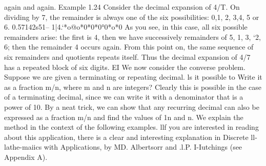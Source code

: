 again and again.
Example 1.24 Consider the decimal expansion of 4/T. On dividing by 7, the remainder is always
one of the six possibilities: 0,1, 2, 3,4, 5 or 6.
0.57142s51--
1|4.‘*o@o*0*0*0°0*o*0
As you see, in this case, all six possible remainders arise: the ﬁrst is 4, then we have successively
remainders of 5, 1, 3, ‘2, 6; then the remainder 4 occurs again. From this point on, the same sequence
of six remainders and quotients repeats itself. Thus the decimal expansion of 4/7 has a repeated
block of six digits. EI
We now consider the converse problem. Suppose we are given a terminating or repeating decimal.
ls it possible to Write it as a fraction m/n, where m and n are integers? Clearly this is possible in
the case of a terminating decimal, since we can write it with a denominator that is a power of 10.
By a neat trick, we can show that any recurring decimal can also be expressed as a fraction m/n
and ﬁnd the values of 1n and n. We explain the method in the context of the following examples.
llf you are interested in reading about this application, there is a clear and interesting explanation in Discrete
ll-lathe-maiics with Applications, by MD. Albertsorr and .l.P. I-Iutchings (see Appendix A).



